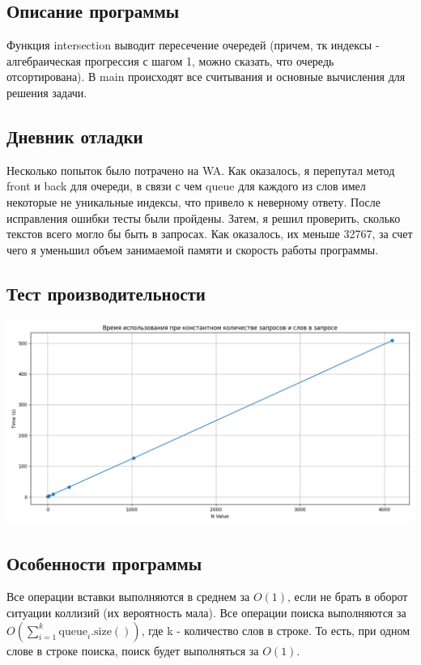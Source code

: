 \documentclass[12pt]{article}
\begin{document}
\subsection*{Описание программы}

Функция intersection выводит пересечение очередей (причем, тк индексы - алгебраическая прогрессия с шагом 1, можно сказать, что очередь отсортирована).  
В main происходят все считывания и основные вычисления для решения задачи.

\subsection*{Дневник отладки}  

Несколько попыток было потрачено на WA. Как оказалось, я перепутал метод front и back для очереди, в связи с чем queue для каждого из слов имел некоторые не уникальные индексы, что привело к неверному ответу. 
После исправления ошибки тесты были пройдены. 
Затем, я решил проверить, сколько текстов всего могло бы быть в запросах. Как оказалось, их меньше 32767, за счет чего я уменьшил объем занимаемой памяти и скорость работы программы.

\subsection*{Тест производительности}

\includegraphics[width=7in]{Figure_1.png}

\subsection*{Особенности программы}

Все операции вставки выполняются в среднем за \( O(1) \), если не брать в оборот ситуации коллизий (их вероятность мала).
Все операции поиска выполняются за \( O\left(\sum_{i=1}^{k} \text{queue}_i.\text{size}()\right) \), где k - количество слов в строке.  
То есть, при одном слове в строке поиска, поиск будет выполняться за \( O(1) \).
\end{document}
